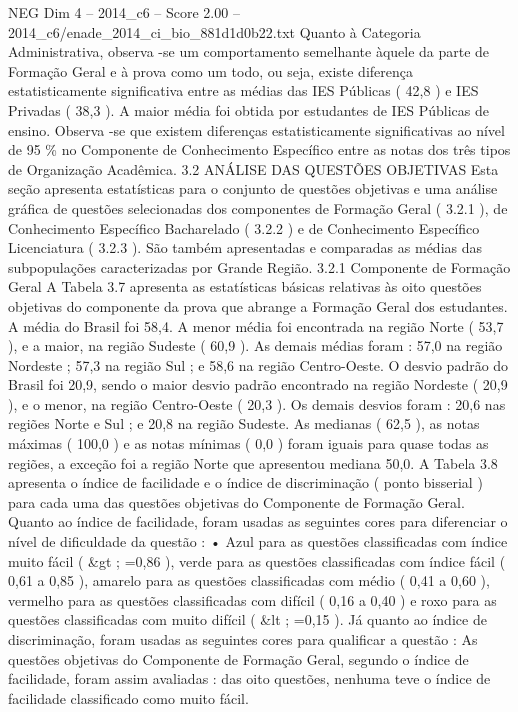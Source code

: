 \begin{textsample}{NEG Dim 4 – 2014\_c6 – Score 2.00 – 2014\_c6/enade\_2014\_ci\_bio\_881d1d0b22.txt}
Quanto à Categoria Administrativa, observa -se um comportamento semelhante àquele da parte de Formação Geral e à prova como um todo, ou seja, existe diferença estatisticamente significativa entre as médias das IES Públicas ( 42,8 ) e IES Privadas ( 38,3 ).
A maior média foi obtida por estudantes de IES Públicas de ensino.
Observa -se que existem diferenças estatisticamente significativas ao nível de 95 \% no Componente de Conhecimento Específico entre as notas dos três tipos de Organização Acadêmica. 3.2 ANÁLISE DAS QUESTÕES OBJETIVAS Esta seção apresenta estatísticas para o conjunto de questões objetivas e uma análise gráfica de questões selecionadas dos componentes de Formação Geral ( 3.2.1 ), de Conhecimento Específico Bacharelado ( 3.2.2 ) e de Conhecimento Específico Licenciatura ( 3.2.3 ).
São também apresentadas e comparadas as médias das subpopulações caracterizadas por Grande Região. 3.2.1 Componente de Formação Geral A Tabela 3.7 apresenta as estatísticas básicas relativas às oito questões objetivas do componente da prova que abrange a Formação Geral dos estudantes.
A média do Brasil foi 58,4.
A menor média foi encontrada na região Norte ( 53,7 ), e a maior, na região Sudeste ( 60,9 ).
As demais médias foram : 57,0 na região Nordeste ; 57,3 na região Sul ; e 58,6 na região Centro-Oeste.
O desvio padrão do Brasil foi 20,9, sendo o maior desvio padrão encontrado na região Nordeste ( 20,9 ), e o menor, na região Centro-Oeste ( 20,3 ).
Os demais desvios foram : 20,6 nas regiões Norte e Sul ; e 20,8 na região Sudeste.
As medianas ( 62,5 ), as notas máximas ( 100,0 ) e as notas mínimas ( 0,0 ) foram iguais para quase todas as regiões, a exceção foi a região Norte que apresentou mediana 50,0.
A Tabela 3.8 apresenta o índice de facilidade e o índice de discriminação ( ponto bisserial ) para cada uma das questões objetivas do Componente de Formação Geral.
Quanto ao índice de facilidade, foram usadas as seguintes cores para diferenciar o nível de dificuldade da questão : • Azul para as questões classificadas com índice muito fácil ( \&gt ; =0,86 ), verde para as questões classificadas com índice fácil ( 0,61 a 0,85 ), amarelo para as questões classificadas com médio ( 0,41 a 0,60 ), vermelho para as questões classificadas com difícil ( 0,16 a 0,40 ) e roxo para as questões classificadas com muito difícil ( \&lt ; =0,15 ).
Já quanto ao índice de discriminação, foram usadas as seguintes cores para qualificar a questão : As questões objetivas do Componente de Formação Geral, segundo o índice de facilidade, foram assim avaliadas : das oito questões, nenhuma teve o índice de facilidade classificado como muito fácil.

\end{textsample}
